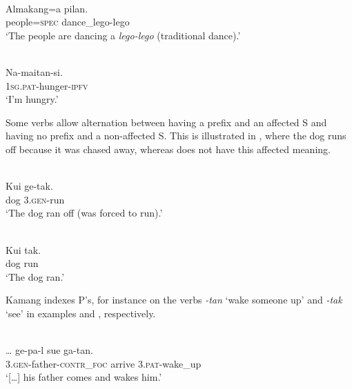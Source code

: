 \ea 
\label{ex:10:1235}
 \\
 \gll      Almakang=a   pilan.    \\
    people=\textsc{spec} dance\_lego-lego    \\
 \glt  `The people are dancing a \textit{lego-lego} (traditional dance).'
\z

 

 




\ea%
\label{bkm:Ref353455458}
 \\
\gll     Na-maitan-si. \\  
    \textsc{1sg.pat-}hunger-\textsc{ipfv}  \\
\glt  `I'm hungry.'
\z

 





Some verbs allow alternation between having a prefix and an affected S and having no prefix and a non-affected S. This is illustrated in , where the dog runs off because it was chased away, whereas  does not have this affected meaning.


\ea%
\label{bkm:Ref353455505}
 \\
\gll   Kui  ge-tak.     \\  
     dog  3.\textsc{gen}{}-run     \\
\glt  `The dog ran off (was forced to run).'
\z




 



\ea%
\label{bkm:Ref324857914}
 \\
\gll    Kui  tak.  \\  
     dog  run   \\
\glt  `The dog ran.'
\z







Kamang indexes P's, for instance on the verbs \textit{{}-tan} `wake someone up' and \textit{{}-tak} `see' in examples  and , respectively.


\ea 
\label{ex:10:1236}
 \\
 \gll    {\ob}\dots{\cb}  ge-pa-l  sue  ga-tan.  \\
    [{\dots}]  3.\textsc{gen}{}-father-\textsc{contr\_foc} arrive  3.\textsc{pat}{}-wake\_up   \\
 \glt  `[{\dots}] his father comes and wakes him.'
\z








